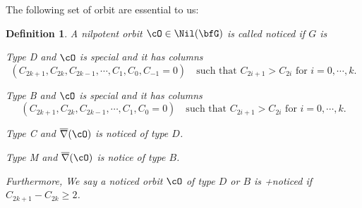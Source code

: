 \documentclass[12pt,a4paper]{amsart}
\def\eDD{\overline{\nabla}}
\def\DD{\nabla}
\numberwithin{equation}{section}
\newtheorem{defn}[thm]{Definition}
\theoremstyle{remark}
\def\nNil{\Nil^{\mathrm n}}
\def\eNil{\Nil^{\mathrm e}}
\newcommand{\noticed}{noticed }
\newcommand{\ess}{essential }
\begin{document}
The following set of orbit are essential to us:
\begin{defn} \label{def:noticed}
  A nilpotent orbit $\cO\in \Nil(\bfG)$ is called \emph{\noticed} if $G$ is
  \begin{des}
    \item [Type D] and $\cO$ is special and it has columns
          \[
            ( C_{2k+1},C_{2k},C_{2k-1},\cdots, C_{1},C_{0}, C_{-1}=0 )
            \quad \text{such that } C_{2i+1}>C_{2i} \text{ for } i=0, \cdots, k.
          \]
    \item [Type B] and $\cO$ is special and it has columns
          \[
            ( C_{2k+1},C_{2k},C_{2k-1},\cdots, C_{1},C_{0} =0 )
            \quad \text{such that } C_{2i+1}>C_{2i} \text{ for } i=0, \cdots, k.
          \]
    \item [Type C] and $\eDD(\cO)$ is noticed of type $D$.

    \item [Type M] and $\eDD(\cO)$ is notice of type $B$.
  \end{des}
  Furthermore, We say a noticed orbit $\cO$ of type $D$ or $B$ is
  \emph{+noticed}
  if $C_{2k+1}-C_{2k}\geq 2$.
\end{defn}
\end{document}
